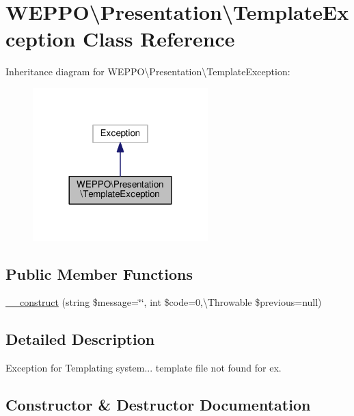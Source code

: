 \hypertarget{classWEPPO_1_1Presentation_1_1TemplateException}{}\section{W\+E\+P\+PO\textbackslash{}Presentation\textbackslash{}Template\+Exception Class Reference}
\label{classWEPPO_1_1Presentation_1_1TemplateException}


Inheritance diagram for W\+E\+P\+PO\textbackslash{}Presentation\textbackslash{}Template\+Exception\+:\nopagebreak
\begin{figure}[H]
\begin{center}
\leavevmode
\includegraphics[width=192pt]{classWEPPO_1_1Presentation_1_1TemplateException__inherit__graph}
\end{center}
\end{figure}
\subsection*{Public Member Functions}
\begin{DoxyCompactItemize}
\item 
\hyperlink{classWEPPO_1_1Presentation_1_1TemplateException_a15caef68cec0c711ce106d354e123377}{\+\_\+\+\_\+construct} (string \$message=\char`\"{}\char`\"{}, int \$code=0,\textbackslash{}Throwable \$previous=null)
\end{DoxyCompactItemize}


\subsection{Detailed Description}
Exception for Templating system... template file not found for ex. 

\subsection{Constructor \& Destructor Documentation}
